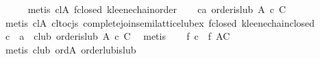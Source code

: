 \begin{isabellebody}
\ \ \ \ \isamarkupfalse%
\ {}metis\ cl{}A\ f{}closed\ kleene{}chain{}order{}\isanewline
\isanewline
\ \ \isamarkupfalse%
\ {}{}c{}{}{}a{}\ order{}is{}lub\ A\ c\ {}C{}\isanewline
\ \ \ \ \isamarkupfalse%
\ {}metis\ cl{}A\ cl{}to{}cjs\ complete{}join{}semilattice{}lub{}ex\ f{}closed\ kleene{}chain{}closed{}\isanewline
\ \ \isamarkupfalse%
\ \isamarkupfalse%
\ c\ {}{}\ {}a\ \ c{}lub{}\ {}order{}is{}lub\ A\ c\ {}C{}\ \isamarkupfalse%
\ metis\isanewline
\ \ \isamarkupfalse%
\ {}f\ c\ {}\ f\ {}{}\isactrlbsub AC{}{}\isanewline
\ \ \ \ \isamarkupfalse%
\ {}metis\ c{}lub\ ord{}A\ order{}lub{}is{}lub{}\isanewline

\end{isabellebody}
